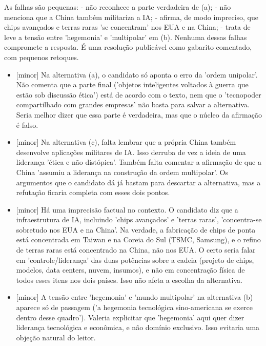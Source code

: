 \documentclass{article}%
\begin{document}
\newline%
As falhas são pequenas:\newline%
{-} não reconhece a parte verdadeira de (a);\newline%
{-} não menciona que a China também militariza a IA;\newline%
{-} afirma, de modo impreciso, que chips avançados e terras raras 'se concentram' nos EUA e na China;\newline%
{-} trata de leve a tensão entre 'hegemonia' e 'multipolar' em (b).\newline%
\newline%
Nenhuma dessas falhas compromete a resposta. É uma resolução publicável como gabarito comentado, com pequenos retoques.%
\begin{itemize}%
\item%
{[}minor{]} Na alternativa (a), o candidato só aponta o erro da 'ordem unipolar'. Não comenta que a parte final ('objetos inteligentes voltados à guerra que estão sob discussão ética') está de acordo com o texto, nem que o 'tecnopoder compartilhado com grandes empresas' não basta para salvar a alternativa. Seria melhor dizer que essa parte é verdadeira, mas que o núcleo da afirmação é falso.%
\item%
{[}minor{]} Na alternativa (c), falta lembrar que a própria China também desenvolve aplicações militares de IA. Isso derruba de vez a ideia de uma liderança 'ética e não distópica'. Também falta comentar a afirmação de que a China 'assumiu a liderança na construção da ordem multipolar'. Os argumentos que o candidato dá já bastam para descartar a alternativa, mas a refutação ficaria completa com esses dois pontos.%
\item%
{[}minor{]} Há uma imprecisão factual no contexto. O candidato diz que a infraestrutura de IA, incluindo 'chips avançados' e 'terras raras', 'concentra{-}se sobretudo nos EUA e na China'. Na verdade, a fabricação de chips de ponta está concentrada em Taiwan e na Coreia do Sul (TSMC, Samsung), e o refino de terras raras está concentrado na China, não nos EUA. O certo seria falar em 'controle/liderança' das duas potências sobre a cadeia (projeto de chips, modelos, data centers, nuvem, insumos), e não em concentração física de todos esses itens nos dois países. Isso não afeta a escolha da alternativa.%
\item%
{[}minor{]} A tensão entre 'hegemonia' e 'mundo multipolar' na alternativa (b) aparece só de passagem ('a hegemonia tecnológica sino{-}americana se exerce dentro desse quadro'). Valeria explicitar que 'hegemonia' aqui quer dizer liderança tecnológica e econômica, e não domínio exclusivo. Isso evitaria uma objeção natural do leitor.%
\end{itemize}%
\end{document}

